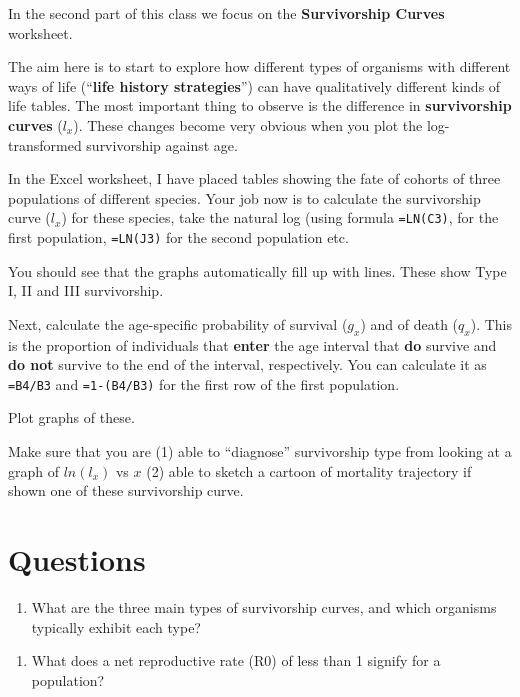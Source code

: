 \documentclass[
  a4paper]{book}
\providecommand{\tightlist}{%
  \setlength{\itemsep}{0pt}\setlength{\parskip}{0pt}}
\begin{document}
In the second part of this class we focus on the \textbf{Survivorship Curves} worksheet.

The aim here is to start to explore how different types of organisms with different ways of life (``\textbf{life history strategies}'') can have qualitatively different kinds of life tables. The most important thing to observe is the difference in \textbf{survivorship curves} (\(l_x\)). These changes become very obvious when you plot the log-transformed survivorship against age.

In the Excel worksheet, I have placed tables showing the fate of cohorts of three populations of different species. Your job now is to calculate the survivorship curve (\(l_x\)) for these species, take the natural log (using formula \texttt{=LN(C3)}, for the first population, \texttt{=LN(J3)} for the second population etc.

You should see that the graphs automatically fill up with lines. These show Type I, II and III survivorship.

Next, calculate the age-specific probability of survival (\(g_x\)) and of death (\(q_x\)). This is the proportion of individuals that \textbf{enter} the age interval that \textbf{do} survive and \textbf{do not} survive to the end of the interval, respectively. You can calculate it as \texttt{=B4/B3} and \texttt{=1-(B4/B3)} for the first row of the first population.

Plot graphs of these.

Make sure that you are (1) able to ``diagnose'' survivorship type from looking at a graph of \(ln(l_x)\) vs \(x\) (2) able to sketch a cartoon of mortality trajectory if shown one of these survivorship curve.

\section{Questions}\label{questions-7}

\begin{enumerate}
\def\labelenumi{\arabic{enumi}.}
\tightlist
\item
  What are the three main types of survivorship curves, and which organisms typically exhibit each type?
\end{enumerate}

\begin{enumerate}
\def\labelenumi{\arabic{enumi}.}
\setcounter{enumi}{1}
\tightlist
\item
  What does a net reproductive rate (R0) of less than 1 signify for a population?
\end{enumerate}
\end{document}
